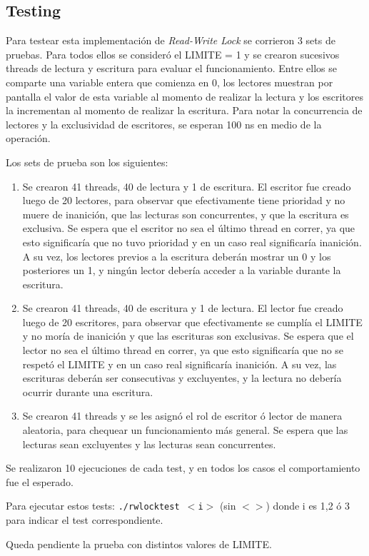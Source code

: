 \subsection{Testing}

Para testear esta implementación de {\it Read-Write Lock} se corrieron 3 sets de pruebas.  Para todos ellos se consideró el LIMITE = 1 y se crearon sucesivos threads de lectura y escritura para evaluar el funcionamiento.  Entre ellos se comparte una variable entera que comienza en 0, los lectores muestran por pantalla el valor de esta variable al momento de realizar la lectura y los escritores la incrementan al momento de realizar la escritura.  Para notar la concurrencia de lectores y la exclusividad de escritores, se esperan 100 ns en medio de la operación.

Los sets de prueba son los siguientes:

\begin{enumerate}
\item Se crearon 41 threads, 40 de lectura y 1 de escritura.  El escritor fue creado luego de 20 lectores, para observar que efectivamente tiene prioridad y no muere de inanición, que las lecturas son concurrentes, y que la escritura es exclusiva.  Se espera que el escritor no sea el último thread en correr, ya que esto significaría que no tuvo prioridad y en un caso real significaría inanición.  A su vez, los lectores previos a la escritura deberán mostrar un 0 y los posteriores un 1, y ningún lector debería acceder a la variable durante la escritura.
\item Se crearon 41 threads, 40 de escritura y 1 de lectura.  El lector fue creado luego de 20 escritores, para observar que efectivamente se cumplía el LIMITE y no moría de inanición y que las escrituras son exclusivas.  Se espera que el lector no sea el último thread en correr, ya que esto significaría que no se respetó el LIMITE y en un caso real significaría inanición.  A su vez, las escrituras deberán ser consecutivas y excluyentes, y la lectura no debería ocurrir durante una escritura.
\item Se crearon 41 threads y se les asignó el rol de escritor ó lector de manera aleatoria, para chequear un funcionamiento más general.  Se espera que las lecturas sean excluyentes y las lecturas sean concurrentes.
\end{enumerate}

Se realizaron 10 ejecuciones de cada test, y en todos los casos el comportamiento fue el esperado.

Para ejecutar estos tests: {\tt ./rwlocktest $<$i$>$} (sin $< >$) donde i es 1,2 ó 3 para indicar el test correspondiente.

Queda pendiente la prueba con distintos valores de LIMITE.